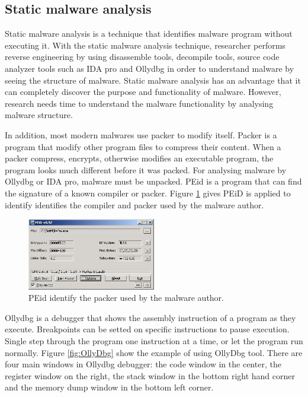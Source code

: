 \subsection{Static malware analysis}

Static malware analysis is a technique that identifies malware program without executing it. With the static malware analysis technique, researcher performs reverse engineering by using disassemble tools, decompile tools, source code analyzer tools such as IDA pro and Ollydbg in order to understand malware by seeing the structure of malware. Static malware analysis has an advantage that it can completely discover the purpose and functionality of malware. However, research needs time to understand the malware functionality by analysing malware structure.

In addition, most modern malwares use packer to modify itself. Packer is a program that modify other program files to compress their content. When a packer compress, encrypts, otherwise modifies an executable program, the program looks much different before it was packed. For analysing malware by Ollydbg or IDA pro, malware must be unpacked. PEid is a program that can find the signature of a known compiler or packer. Figure \ref{fig:PEid} gives PEiD is applied to identify identifies the compiler and packer used by the malware author.

\begin{figure}[h!]
\centering
\includegraphics[width=0.5\textwidth]{graph/PEid.jpg}
\caption{PEid identify the packer used by the malware author.}
\label{fig:PEid}
\end{figure}

Ollydbg is a debugger that shows the assembly instruction of a program as they execute. Breakpoints can be setted on specific instructions to pause execution. Single step through the program one instruction at a time, or let the program run normally. Figure \ref{fig:OllyDbg} show the example of using OllyDbg tool. There are four main windows in Ollydbg debugger: the code window in the center, the register window on the right, the stack window in the bottom right hand  corner and the memory dump window in the bottom left corner. 

